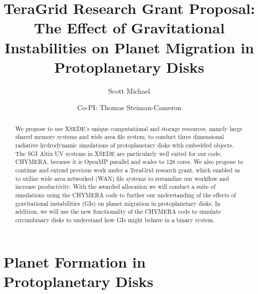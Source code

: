 \documentclass[12pt,preprint2]{aastex}
\begin{document}
\renewcommand{\baselinestretch}{1.00}

\title{\large TeraGrid Research Grant Proposal: The Effect of Gravitational Instabilities on Planet Migration in Protoplanetary Disks}

\author{Scott Michael
\and
Co-PI: Thomas Steiman-Cameron}


\begin{abstract}

  We propose to use XSEDE's unique computational and storage resources, namely large shared memory systems and wide area
  file system, to conduct three dimensional radiative hydrodynamic simulations of protoplanetary disks with embedded
  objects. The SGI Altix UV systems in XSEDE are particularly well suited for our code, CHYMERA, because it is OpenMP
  parallel and scales to 128 cores. We also propose to continue and extend previous work under a TeraGrid research
  grant, which enabled us to utilize wide area networked (WAN) file systems to streamline our workflow and increase
  productivity. With the awarded allocation we will conduct a suite of simulations using the CHYMERA code to further our
  understanding of the effects of gravitational instabilities (GIs) on planet migration in protoplanetary disks. In
  addition, we will use the new functionality of the CHYMERA code to simulate circumbinary disks to understand how GIs
  might behave in a binary system.
  \\

\end{abstract}

\section{Planet Formation in Protoplanetary Disks}
\label{sec:intro}
\end{document}
